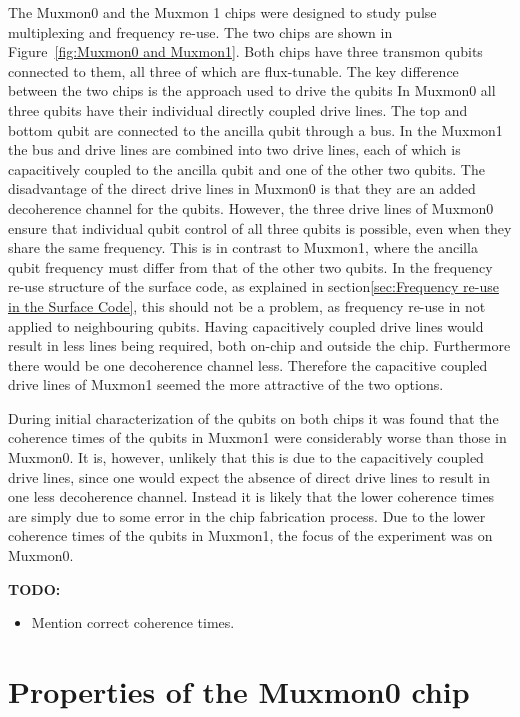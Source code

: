      The Muxmon0 and the Muxmon 1 chips were designed to study pulse multiplexing and frequency re-use. The two chips are shown in Figure~\ref{fig:Muxmon0 and Muxmon1}. Both chips have three transmon qubits connected to them, all three of which are flux-tunable. The key difference between the two chips is the approach used to drive the qubits In Muxmon0 all three qubits have their individual directly coupled drive lines. The top and bottom qubit are connected to the ancilla qubit through a bus. In the Muxmon1 the bus and drive lines are combined into two drive lines, each of which is capacitively coupled to the ancilla qubit and one of the other two qubits. The disadvantage of the direct drive lines in Muxmon0 is that they are an added decoherence channel for the qubits. However, the three drive lines of Muxmon0 ensure that individual qubit control of all three qubits is possible, even when they share the same frequency. This is in contrast to Muxmon1, where the ancilla qubit frequency must differ from that of the other two qubits. In the frequency re-use structure of the surface code, as explained in section\ref{sec:Frequency re-use in the Surface Code}, this should not be a problem, as frequency re-use in not applied to neighbouring qubits. Having capacitively coupled drive lines would result in less lines being required, both on-chip and outside the chip. Furthermore there would be one decoherence channel less. Therefore the capacitive coupled drive lines of Muxmon1 seemed the more attractive of the two options.

      During initial characterization of the qubits on both chips it was found that the coherence times of the qubits in Muxmon1 were considerably worse than those in Muxmon0. It is, however, unlikely that this is due to the capacitively coupled drive lines, since one would expect the absence of direct drive lines to result in one less decoherence channel. Instead it is likely that the lower coherence times are simply due to some error in the chip fabrication process. Due to the lower coherence times of the qubits in Muxmon1, the focus of the experiment was on Muxmon0.

      \textbf{TODO:}
      \begin{itemize}
        \item Mention correct coherence times.
      \end{itemize}

    \section{Properties of the Muxmon0 chip}

